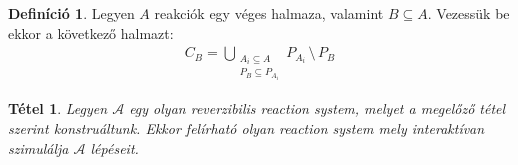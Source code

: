 \documentclass[12pt]{article}
\theoremstyle{definition}
\newtheorem*{definition*}{Definíció}
\theoremstyle{remark}
\theoremstyle{plain}
\newtheorem*{theorem*}{Tétel}
\theoremstyle{remark}
\theoremstyle{plain}
\begin{document}
    \begin{definition*}
        Legyen $A$ reakciók egy véges halmaza, valamint $B \subseteq A$. Vezessük be ekkor a következő halmazt:
        \begin{align*}
            C_{B} = \bigcup\limits_{\substack{A_{i} \subseteq A \\ P_{B} \subseteq P_{A_{i}}}} P_{A_{i}} \,\setminus\, P_{B}
        \end{align*}
    \end{definition*}

    \begin{theorem*}
        Legyen $\mathscr{A}$ egy olyan reverzibilis \textit{reaction system}, melyet a megelőző tétel szerint konstruáltunk. Ekkor felírható olyan \textit{reaction system} mely interaktívan szimulálja $\mathscr{A}$ lépéseit.
    \end{theorem*}
\end{document}
